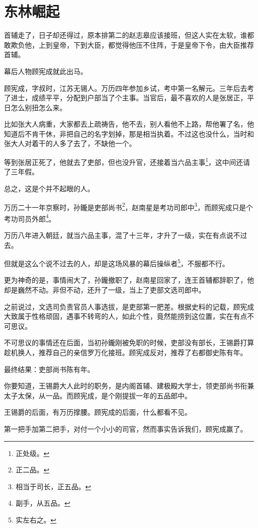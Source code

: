 \section{东林崛起}
\ifnum{}
	\begin{multicols}{\theparacolNo}
\fi
首辅走了，日子却还得过，原本排第二的赵志皋应该接班，但这人实在太软，谁都敢欺负他，上到皇帝，下到大臣，都觉得他压不住阵，于是皇帝下令，由大臣推荐首辅。

幕后人物顾宪成就此出马。

顾宪成，字叔时，江苏无锡人。万历四年参加乡试，考中第一名解元。三年后去考了进士，成绩平平，分配到户部当了个主事。当官后，最不喜欢的人是张居正，平日怎么别扭怎么来。

比如张大人病重，大家都去上疏祷告，他不去，别人看他不上路，帮他署了名，他知道后不肯干休，非把自己的名字划掉，那是相当执着。不过这也没什么，当时和张大人对着干的人多了去了，不缺他一个。

等到张居正死了，他就去了吏部，但也没升官，还接着当六品主事\footnote{正处级。}，这中间还请了三年假。

总之，这是个并不起眼的人。

万历二十一年京察时，孙鑨是吏部尚书\footnote{正二品。}，赵南星是考功司郎中\footnote{相当于司长，正五品。}，而顾宪成只是个考功司员外郎\footnote{副手，从五品。}。

万历八年进入朝廷，就当六品主事，混了十三年，才升了一级，实在有点说不过去。

但就是这么个说不过去的人，却是这场风暴的幕后操纵者\footnote{实左右之。}，不服都不行。

更为神奇的是，事情闹大了，孙鑨撤职了，赵南星回家了，连王首辅都辞职了，他却是巍然不动。非但不动，还升了一级，当上了吏部文选司郎中。

之前说过，文选司负责官员人事选拔，是吏部第一肥差。根据史料的记载，顾宪成大致属于性格顽固，遇事不转弯的人，如此个性，竟然能捞到这位置，实在有点不可思议。

不可思议的事情还在后面，当初孙鑨刚被免职的时候，吏部没有部长，王锡爵打算趁机换人，推荐自己的亲信罗万化接班。顾宪成反对，推荐了右都御史陈有年。

最终结果：吏部尚书陈有年。

你要知道，王锡爵大人此时的职务，是内阁首辅、建极殿大学士，领吏部尚书衔兼太子太保，从一品。而顾宪成，是个刚提拔一年的五品郎中。

王锡爵的后面，有万历撑腰。顾宪成的后面，什么都看不见。

第一把手加第二把手，对付一个小小的司官，然而事实告诉我们，顾宪成赢了。


\end{multicols}
